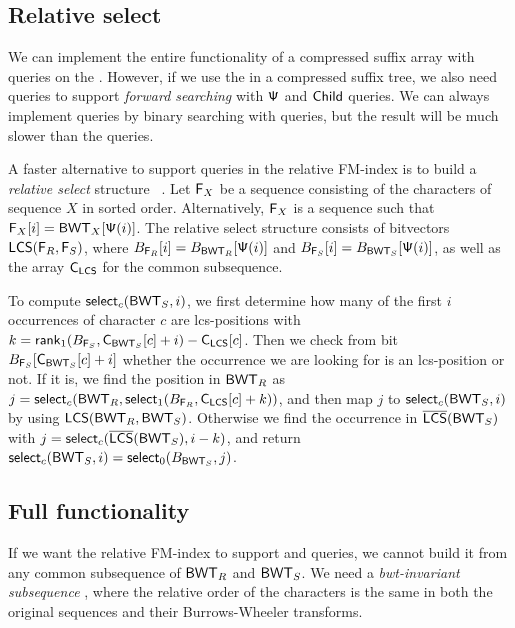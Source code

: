 \subsection{Relative select}

We can implement the entire functionality of a compressed suffix array with
\rank{} queries on the \BWT. However, if we use the \CSA{} in a compressed
suffix tree, we also need \select{} queries to support \emph{forward
searching} with $\mathsf{\Psi}$ and $\mathsf{Child}$ queries. We can always implement
\select{} queries by binary searching with \rank{} queries, but the result
will be much slower than the \rank{} queries.

A faster alternative to support \select{} queries in the relative FM-index
is to build a \emph{relative select} structure \rselect{}~\cite{Boucher2015}.
Let $\mathsf{F}_{X}$ be a sequence consisting of the characters of sequence $X$ in
sorted order. Alternatively, $\mathsf{F}_{X}$ is a sequence such that $\mathsf{F}_{X}[i] =
\mathsf{BWT}_{X}[\mathsf{\Psi}(i)]$. The relative select structure consists of bitvectors
$\mathsf{LCS}(\mathsf{F}_{R}, \mathsf{F}_{S})$, where $B_{\mathsf{F}_{R}}[i] = B_{\mathsf{BWT}_{R}}[\mathsf{\Psi}(i)]$ and
$B_{\mathsf{F}_{S}}[i] = B_{\mathsf{BWT}_{S}}[\mathsf{\Psi}(i)]$, as well as the \C{} array
$\mathsf{C}_{\mathsf{LCS}}$ for the common subsequence.

To compute $\mathsf{select}_{c}(\mathsf{BWT}_{S}, i)$, we first determine how many of
the first $i$ occurrences of character $c$ are lcs-positions with $k =
\mathsf{rank}_{1}(B_{\mathsf{F}_{S}}, \mathsf{C}_{\mathsf{BWT}_{S}}[c] + i) - \mathsf{C}_{\mathsf{LCS}}[c]$. Then we check
from bit $B_{\mathsf{F}_{S}}[\mathsf{C}_{\mathsf{BWT}_{S}}[c] + i]$ whether the occurrence we are
looking for is an lcs-position or not. If it is,
we find the position in $\mathsf{BWT}_{R}$ as $j = \mathsf{select}_{c}(\mathsf{BWT}_{R},
\mathsf{select}_{1}(B_{\mathsf{F}_{R}}, \mathsf{C}_{\mathsf{LCS}}[c] + k))$, and then map $j$ to
$\mathsf{select}_{c}(\mathsf{BWT}_{S}, i)$ by using $\mathsf{LCS}(\mathsf{BWT}_{R}, \mathsf{BWT}_{S})$. Otherwise we
find the occurrence in $\overline{ \mathsf{LCS} }(\mathsf{BWT}_{S})$ with $j = \mathsf{select}_{c}(\overline{ \mathsf{LCS} }(\mathsf{BWT}_{S}),
i-k)$, and return $\mathsf{select}_{c}(\mathsf{BWT}_{S}, i) = \mathsf{select}_{0}(B_{\mathsf{BWT}_{S}}, j)$.

\subsection{Full functionality}

If we want the relative FM-index to support \locate{} and \extract{} queries,
we cannot build it from any common subsequence of $\mathsf{BWT}_{R}$ and $\mathsf{BWT}_{S}$.
We need a \emph{bwt-invariant subsequence} \cite{Belazzougui2014}, where the
relative order of the characters is the same in both the original sequences
and their Burrows-Wheeler transforms.

